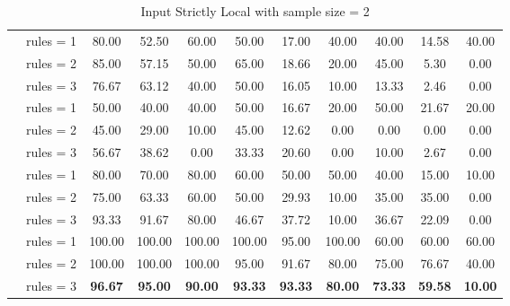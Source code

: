\begin{table*}[t]
{\begin{tabular}{l c ccc ccc ccc}
           \hdashline
           \multirow{3}{*}{DeepSeek-V3} & rules = 1 & 80.00 & 52.50 & 60.00 & 50.00 & 17.00 & 40.00 & 40.00 & 14.58 & 40.00\\
           & rules = 2 & 85.00 & 57.15 & 50.00 & 65.00 & 18.66 & 20.00 & 45.00 & 5.30 & 0.00\\
           & \cellcolor{SeaGreen3!50}rules = 3 & \cellcolor{SeaGreen3!50}76.67 & \cellcolor{SeaGreen3!50}63.12 & \cellcolor{SeaGreen3!50}40.00 & \cellcolor{SeaGreen3!50}50.00 & \cellcolor{SeaGreen3!50}16.05 & \cellcolor{SeaGreen3!50}10.00 & \cellcolor{SeaGreen3!50}13.33 & \cellcolor{SeaGreen3!50}2.46 & \cellcolor{SeaGreen3!50}0.00\\
           \hdashline
           \multirow{3}{*}{GPT-4o} & rules = 1 & 50.00 & 40.00 & 40.00 & 50.00 & 16.67 & 20.00 & 50.00 & 21.67 & 20.00\\
           & rules = 2 & 45.00 & 29.00 & 10.00 & 45.00 & 12.62 & 0.00 & 0.00 & 0.00 & 0.00\\
           & \cellcolor{SeaGreen3!50}rules = 3 & \cellcolor{SeaGreen3!50}56.67 & \cellcolor{SeaGreen3!50}38.62 & \cellcolor{SeaGreen3!50}0.00 & \cellcolor{SeaGreen3!50}33.33 & \cellcolor{SeaGreen3!50}20.60 & \cellcolor{SeaGreen3!50}0.00 & \cellcolor{SeaGreen3!50}10.00 & \cellcolor{SeaGreen3!50}2.67 & \cellcolor{SeaGreen3!50}0.00\\
           \hdashline
           \multirow{3}{*}{o1-mini} & rules = 1 & 80.00 & 70.00 & 80.00 & 60.00 & 50.00 & 50.00 & 40.00 & 15.00 & 10.00\\
           & rules = 2 & 75.00 & 63.33 & 60.00 & 50.00 & 29.93 & 10.00 & 35.00 & 35.00 & 0.00 \\
           & \cellcolor{SeaGreen3!50}rules = 3 & \cellcolor{SeaGreen3!50}93.33 & \cellcolor{SeaGreen3!50}91.67 & \cellcolor{SeaGreen3!50}80.00 & \cellcolor{SeaGreen3!50}46.67 & \cellcolor{SeaGreen3!50}37.72 & \cellcolor{SeaGreen3!50}10.00 & \cellcolor{SeaGreen3!50}36.67 & \cellcolor{SeaGreen3!50}22.09 & \cellcolor{SeaGreen3!50}0.00\\
           \hdashline
           \multirow{3}{*}{o3-mini} & rules = 1 & 100.00 & 100.00 & 100.00 & 100.00 & 95.00 & 100.00 & 60.00 & 60.00 & 60.00\\
           & rules = 2 & 100.00 & 100.00 & 100.00 & 95.00 & 91.67 & 80.00 & 75.00 & 76.67 & 40.00\\
           & \cellcolor{SeaGreen3!50}rules = 3 & \cellcolor{SeaGreen3!50}\textbf{96.67} & \cellcolor{SeaGreen3!50}\textbf{95.00} & \cellcolor{SeaGreen3!50}\textbf{90.00} & \cellcolor{SeaGreen3!50}\textbf{93.33} & \cellcolor{SeaGreen3!50}\textbf{93.33} & \cellcolor{SeaGreen3!50}\textbf{80.00} & \cellcolor{SeaGreen3!50}\textbf{73.33} & \cellcolor{SeaGreen3!50}\textbf{59.58} & \cellcolor{SeaGreen3!50}\textbf{10.00}\\
           \bottomrule
    \end{tabular}
    }
    \caption{Input Strictly Local with sample size = 2}
    \label{tab:ISL_main}
\end{table*}